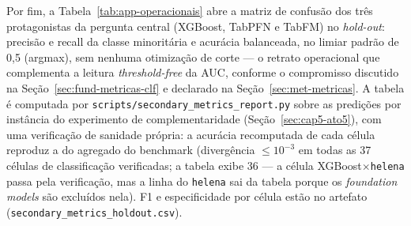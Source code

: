 Por fim, a Tabela~\ref{tab:app-operacionais} abre a matriz de confusão
dos três protagonistas da pergunta central (XGBoost, TabPFN e TabFM) no
\emph{hold-out}: precisão e recall da classe minoritária e acurácia
balanceada, no limiar padrão de 0,5 (argmax), sem nenhuma otimização de
corte --- o retrato operacional que complementa a leitura
\emph{threshold-free} da AUC, conforme o compromisso discutido na
Seção~\ref{sec:fund-metricas-clf} e declarado na
Seção~\ref{sec:met-metricas}. A tabela é computada por
\texttt{scripts/\allowbreak secondary\_\allowbreak metrics\_\allowbreak report.py} sobre as predições por
instância do experimento de complementaridade (Seção~\ref{sec:cap5-ato5}),
com uma verificação de sanidade própria: a acurácia recomputada de cada célula
reproduz a do agregado do benchmark (divergência $\leq 10^{-3}$ em
todas as 37 células de classificação verificadas; a tabela exibe 36 ---
a célula XGBoost$\times$\texttt{helena} passa pela verificação, mas a
linha do \texttt{helena} sai da tabela porque os \emph{foundation
models} são excluídos nela). F1 e especificidade por célula estão no artefato
(\texttt{secondary\_\allowbreak metrics\_\allowbreak holdout.csv}).



